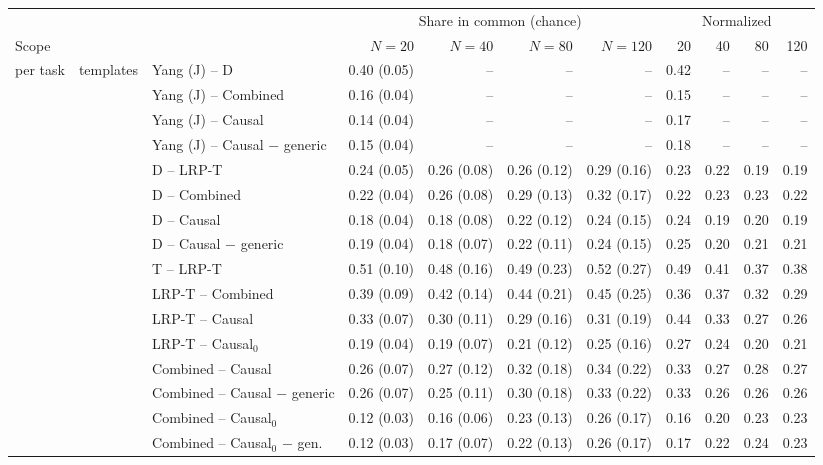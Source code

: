 \begin{tabular}{@{}lllrrrrrrrr@{}}
\toprule
& & & \multicolumn{4}{c}{Share in common (chance)} & \multicolumn{4}{c}{Normalized} \\
\cmidrule(lr){4-7} \cmidrule(lr){8-11}
Scope & & & $N=20$ & $N=40$ & $N=80$ & $N=120$ & 20 & 40 & 80 & 120 \\
\midrule
per task & templates & Yang (J) -- D & 0.40 (0.05) & -- & -- & -- & 0.42 & -- & -- & -- \\
 &  & Yang (J) -- Combined & 0.16 (0.04) & -- & -- & -- & 0.15 & -- & -- & -- \\
 &  & Yang (J) -- Causal & 0.14 (0.04) & -- & -- & -- & 0.17 & -- & -- & -- \\
 &  & Yang (J) -- Causal $-$ generic & 0.15 (0.04) & -- & -- & -- & 0.18 & -- & -- & -- \\
 &  & D -- LRP-T & 0.24 (0.05) & 0.26 (0.08) & 0.26 (0.12) & 0.29 (0.16) & 0.23 & 0.22 & 0.19 & 0.19 \\
 &  & D -- Combined & 0.22 (0.04) & 0.26 (0.08) & 0.29 (0.13) & 0.32 (0.17) & 0.22 & 0.23 & 0.23 & 0.22 \\
 &  & D -- Causal & 0.18 (0.04) & 0.18 (0.08) & 0.22 (0.12) & 0.24 (0.15) & 0.24 & 0.19 & 0.20 & 0.19 \\
 &  & D -- Causal $-$ generic & 0.19 (0.04) & 0.18 (0.07) & 0.22 (0.11) & 0.24 (0.15) & 0.25 & 0.20 & 0.21 & 0.21 \\
 &  & T -- LRP-T & 0.51 (0.10) & 0.48 (0.16) & 0.49 (0.23) & 0.52 (0.27) & 0.49 & 0.41 & 0.37 & 0.38 \\
 &  & LRP-T -- Combined & 0.39 (0.09) & 0.42 (0.14) & 0.44 (0.21) & 0.45 (0.25) & 0.36 & 0.37 & 0.32 & 0.29 \\
 &  & LRP-T -- Causal & 0.33 (0.07) & 0.30 (0.11) & 0.29 (0.16) & 0.31 (0.19) & 0.44 & 0.33 & 0.27 & 0.26 \\
 &  & LRP-T -- Causal$_0$ & 0.19 (0.04) & 0.19 (0.07) & 0.21 (0.12) & 0.25 (0.16) & 0.27 & 0.24 & 0.20 & 0.21 \\
 &  & Combined -- Causal & 0.26 (0.07) & 0.27 (0.12) & 0.32 (0.18) & 0.34 (0.22) & 0.33 & 0.27 & 0.28 & 0.27 \\
 &  & Combined -- Causal $-$ generic & 0.26 (0.07) & 0.25 (0.11) & 0.30 (0.18) & 0.33 (0.22) & 0.33 & 0.26 & 0.26 & 0.26 \\
 &  & Combined -- Causal$_0$ & 0.12 (0.03) & 0.16 (0.06) & 0.23 (0.13) & 0.26 (0.17) & 0.16 & 0.20 & 0.23 & 0.23 \\
 &  & Combined -- Causal$_0$ $-$ gen. & 0.12 (0.03) & 0.17 (0.07) & 0.22 (0.13) & 0.26 (0.17) & 0.17 & 0.22 & 0.24 & 0.23 \\

\end{tabular}
